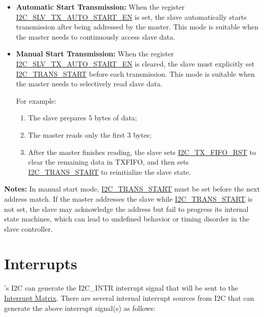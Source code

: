 \documentclass[main\_\_EN.tex]{subfiles}
\begin{document}
\begin{itemize}
  \item \textbf{Automatic Start Transmission:}
  When the register \hyperref[fielddesc:I2CSLVTXAUTOSTARTEN]{I2C\_SLV\_TX\_AUTO\_START\_EN} is set, the slave automatically starts transmission after being addressed by the master.
  This mode is suitable when the master needs to continuously access slave data.

  \item \textbf{Manual Start Transmission:}
  When the register \hyperref[fielddesc:I2CSLVTXAUTOSTARTEN]{I2C\_SLV\_TX\_AUTO\_START\_EN} is cleared, the slave must explicitly set \hyperref[fielddesc:I2CTRANSSTART]{I2C\_TRANS\_START} before each transmission.
  This mode is suitable when the master needs to selectively read slave data.

  For example:
  \begin{enumerate}
    \item The slave prepares 5 bytes of data;
    \item The master reads only the first 3 bytes;
    \item After the master finishes reading, the slave sets \hyperref[fielddesc:I2CTXFIFORST]{I2C\_TX\_FIFO\_RST} to clear the remaining data in TXFIFO, and then sets \hyperref[fielddesc:I2CTRANSSTART]{I2C\_TRANS\_START} to reinitialize the slave state.
  \end{enumerate}
\end{itemize}

{\bfseries Notes:}
In manual start mode, \hyperref[fielddesc:I2CTRANSSTART]{I2C\_TRANS\_START} must be set before the next address match. If the master addresses the slave while \hyperref[fielddesc:I2CTRANSSTART]{I2C\_TRANS\_START} is not set, the slave may acknowledge the address but fail to progress its internal state machines, which can lead to undefined behavior or timing disorder in the slave controller.


\section{Interrupts}
\label{sub:i2c-int}

\chipname{}'s I2C can generate the I2C\_INTR interrupt signal that will be sent to the \hyperref[mod:intmtrx]{Interrupt Matrix}. There are several internal interrupt sources from I2C that can generate the above interrupt signal(s) as follows:
\end{document}
